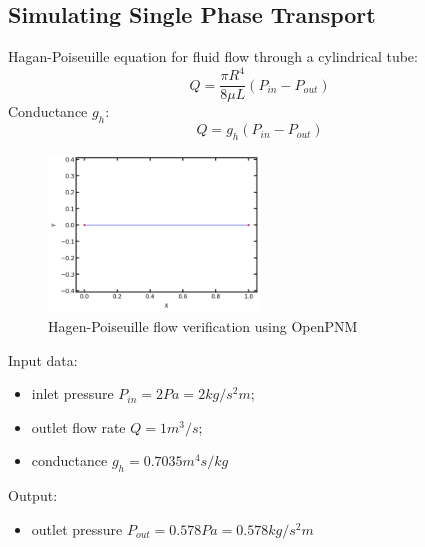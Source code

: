 \documentclass{article}
\begin{document}
\FloatBarrier  %
\subsection{Simulating Single Phase Transport}
Hagan-Poiseuille equation for fluid flow through a cylindrical tube:
\begin{equation}
    Q=\frac{\pi R^4}{8 \mu L} (P_{in}-P_{out})
\end{equation}
Conductance $g_h$:
\begin{equation}
    Q=g_h (P_{in}-P_{out})
\end{equation}
\begin{figure}[htbp]
    \centering
    \includegraphics[width=0.5\textwidth]{images/poiseuilleFlow.png}
    \caption{Hagen-Poiseuille flow verification using OpenPNM}
    \label{fig:poiseuille}
\end{figure}
Input data:
\begin{itemize}
    \item inlet pressure $P_{in} = 2 Pa = 2 kg/s^2m$;
    \item outlet flow rate $Q = 1 m^3/s$;
    \item conductance $g_h = 0.7035 m^4 s/kg$
\end{itemize}
Output:
\begin{itemize}
    \item outlet pressure $P_{out} = 0.578 Pa = 0.578 kg/s^2m$
\end{itemize}

\FloatBarrier  %
\end{document}
